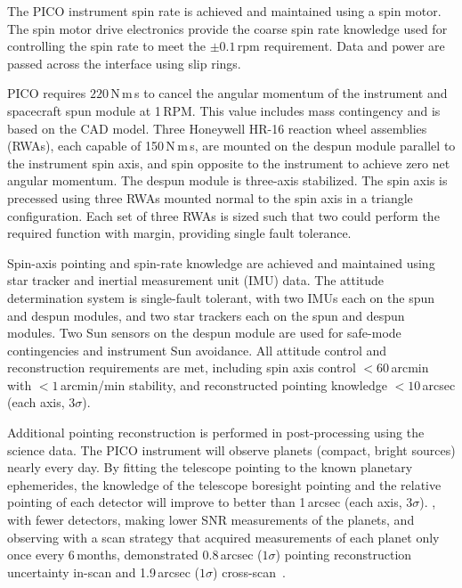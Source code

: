 The PICO instrument spin rate is achieved and maintained using a spin motor. The spin motor drive electronics provide the coarse spin rate knowledge used for controlling the spin rate to meet the $\pm0.1$\,rpm requirement. Data and power are passed across the interface using slip rings.

PICO requires $220$\,N\,m\,s to cancel the angular momentum of the instrument and spacecraft spun module at 1\,RPM. This value includes mass contingency and is based on the CAD model. Three Honeywell HR-16 reaction wheel assemblies (RWAs), each capable of 150\,N\,m\,s, are mounted on the despun module parallel to the instrument spin axis, and spin opposite to the instrument to achieve zero net angular momentum. The despun module is three-axis stabilized. The spin axis is precessed using three RWAs mounted normal to the spin axis in a triangle configuration. Each set of three RWAs is sized such that two could perform the required function with margin, providing single fault tolerance.

Spin-axis pointing and spin-rate knowledge are achieved and maintained using star tracker and inertial measurement unit (IMU) data. The attitude determination system is single-fault tolerant, with two IMUs each on the spun and despun modules, and two star trackers each on the spun and despun modules. Two Sun sensors on the despun module are used for safe-mode contingencies and instrument Sun avoidance. All attitude control and reconstruction requirements are met, including spin axis control $< 60$\,arcmin with $< 1$\,arcmin/min stability, and reconstructed pointing knowledge $< 10$\,arcsec (each axis, $3\sigma$).

Additional pointing reconstruction is performed in post-processing using the science data.  The PICO instrument will observe planets (compact, bright sources) nearly every day.  By fitting the telescope pointing to the known planetary ephemerides, the knowledge of the telescope boresight pointing and the relative pointing of each detector will improve to better than 1\,arcsec (each axis, $3\sigma$). \planck , with fewer detectors, making lower \ac{SNR} measurements of the planets, and observing with a scan strategy that acquired measurements of each planet only once every 6\,months, demonstrated 0.8\,arcsec ($1\sigma$) pointing reconstruction uncertainty in-scan and 1.9\,arcsec ($1\sigma$) cross-scan~\citep{2016A&A...594A...1P}.

\newpage

